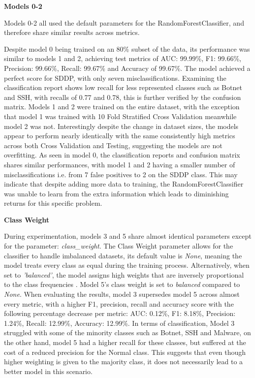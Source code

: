 \textbf{Models 0-2}

\smallskip
Models 0-2 all used the default parameters for the RandomForestClassifier, and therefore share similar results across metrics.

Despite model 0 being trained on an 80\% subset of the data, its performance was similar to models 1 and 2, achieving test metrics of AUC: 99.99\%, F1: 99.66\%, Precision: 99.66\%, Recall: 99.67\% and Accuracy of 99.67\%. The model achieved a perfect score for SDDP, with only seven misclassifications. Examining the classification report shows low recall for less represented classes such as Botnet and SSH, with recalls of 0.77 and 0.78, this is further verified by the confusion matrix. 
Models 1 and 2 were trained on the entire dataset, with the exception that model 1 was trained with 10 Fold Stratified Cross Validation meanwhile model 2 was not. Interestingly despite the change in dataset sizes, the models appear to perform nearly identically with the same consistently high metrics across both Cross Validation and Testing, suggesting the models are not overfitting. As seen in model 0, the classification reports and confusion matrix shares similar performances, with model 1 and 2 having a smaller number of misclassifications i.e. from 7 false positives to 2 on the SDDP class. This may indicate that despite adding more data to training, the RandomForestClassifier was unable to learn from the extra information which leads to diminishing returns for this specific problem. 
 
\medskip
\textbf{Class Weight}

During experimentation, models 3 and 5 share almost identical parameters except for the parameter: \textit{class\_weight}. The Class Weight parameter allows for the classifier to handle imbalanced datasets, its default value is \textit{None}, meaning the model treats every class as equal during the training process. Alternatively, when set to \textit{'balanced'}, the model assigns high weights that are inversely proportional to the class frequencies \parencite{scikit-learn}. Model 5's class weight is set to \textit{balanced} compared to \textit{None}. When evaluating the results, model 3 supersedes model 5 across almost every metric, with a higher F1, precision, recall and accuracy score with the following percentage decrease per metric: AUC: 0.12\%, F1: 8.18\%, Precision: 1.24\%, Recall: 12.99\%, Accuracy: 12.99\%. In terms of classification, Model 3 struggled with some of the minority classes such as Botnet, SSH and Malware, on the other hand, model 5 had a higher recall for these classes, but suffered at the cost of a reduced precision for the Normal class. This suggests that even though higher weighting is given to the majority class, it does not necessarily lead to a better model in this scenario.

